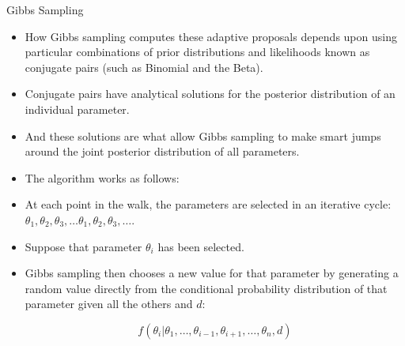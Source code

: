 \documentclass[handout]{beamer}
\begin{document}
\begin{frame}{Gibbs Sampling}
\scriptsize{

\begin{itemize}

\item How Gibbs sampling computes these adaptive proposals depends upon using particular combinations of prior distributions and likelihoods known as conjugate pairs (such as Binomial and the Beta). 

\item Conjugate pairs have analytical solutions for the posterior distribution of an individual parameter. 

\item And these solutions are what allow Gibbs sampling to make smart jumps around the joint posterior distribution of all parameters.

\item The algorithm works as follows:

\item At each point in the walk, the parameters are selected in an iterative cycle: $\theta_1, \theta_2, \theta_3 , \dots \theta_1, \theta_2, \theta_3, \dots.$ 

\item Suppose that parameter $\theta_i$ has been selected.

\item Gibbs sampling then chooses a new value for that parameter by generating a random value directly from
the conditional probability distribution of that parameter given all the others and $d$: 

\begin{displaymath}
f(\theta_i | \theta_1,\dots, \theta_{i-1}, \theta_{i+1}, \dots,\theta_n,d)  
\end{displaymath}





\end{itemize}


} 
\end{frame}
\end{document}
